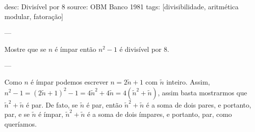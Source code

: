 desc: Divisível por 8
source:  OBM Banco 1981
tags:  [divisibilidade, aritmética modular, fatoração]

---

Mostre que se $n$ é ímpar então $n^2 - 1$ é divisível por $8$.

---

Como $n$ é ímpar podemos escrever $n = 2 \tilde{n} + 1$ com $\tilde{n}$ inteiro. Assim, $n^2 - 1 = (2 \tilde{n} + 1)^2 - 1 = 4 \tilde{n}^2 + 4 \tilde{n} = 4 (\tilde{n}^2 + \tilde{n})$, assim basta mostrarmos que $\tilde{n}^2 + \tilde{n}$ é par. De fato, se $\tilde{n}$ é par, então $\tilde{n}^2 + \tilde{n}$ é a soma de dois pares, e portanto, par, e se $\tilde{n}$ é ímpar, $\tilde{n}^2 + \tilde{n}$ é a soma de dois ímpares, e portanto, par, como queríamos.
